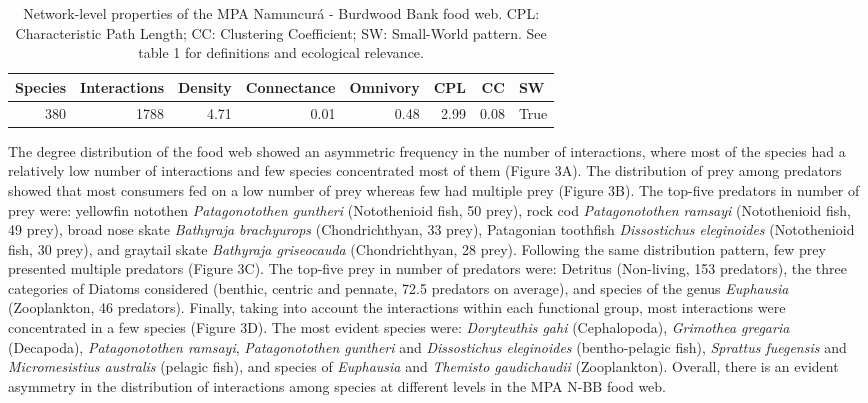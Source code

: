 \documentclass[preprint, 3p,
authoryear]{elsarticle} %
\begin{document}
\begin{table}

\caption{\label{tab:table2}Network-level properties of the MPA Namuncurá - Burdwood Bank food web. CPL: Characteristic Path Length; CC: Clustering Coefficient; SW: Small-World pattern. See table 1 for definitions and ecological relevance.}
\centering
\begin{tabular}[t]{r|r|r|r|r|r|r|l}
\hline
\textbf{Species} & \textbf{Interactions} & \textbf{Density} & \textbf{Connectance} & \textbf{Omnivory} & \textbf{CPL} & \textbf{CC} & \textbf{SW}\\
\hline
380 & 1788 & 4.71 & 0.01 & 0.48 & 2.99 & 0.08 & True\\
\hline
\end{tabular}
\end{table}

The degree distribution of the food web showed an asymmetric frequency
in the number of interactions, where most of the species had a
relatively low number of interactions and few species concentrated most
of them (Figure 3A). The distribution of prey among predators showed
that most consumers fed on a low number of prey whereas few had multiple
prey (Figure 3B). The top-five predators in number of prey were:
yellowfin notothen \emph{Patagonotothen guntheri} (Notothenioid fish, 50
prey), rock cod \emph{Patagonotothen ramsayi} (Notothenioid fish, 49
prey), broad nose skate \emph{Bathyraja brachyurops} (Chondrichthyan, 33
prey), Patagonian toothfish \emph{Dissostichus eleginoides}
(Notothenioid fish, 30 prey), and graytail skate \emph{Bathyraja
griseocauda} (Chondrichthyan, 28 prey). Following the same distribution
pattern, few prey presented multiple predators (Figure 3C). The top-five
prey in number of predators were: Detritus (Non-living, 153 predators),
the three categories of Diatoms considered (benthic, centric and
pennate, 72.5 predators on average), and species of the genus
\emph{Euphausia} (Zooplankton, 46 predators). Finally, taking into
account the interactions within each functional group, most interactions
were concentrated in a few species (Figure 3D). The most evident species
were: \emph{Doryteuthis gahi} (Cephalopoda), \emph{Grimothea gregaria}
(Decapoda), \emph{Patagonotothen ramsayi}, \emph{Patagonotothen
guntheri} and \emph{Dissostichus eleginoides} (bentho-pelagic fish),
\emph{Sprattus fuegensis} and \emph{Micromesistius australis} (pelagic
fish), and species of \emph{Euphausia} and \emph{Themisto gaudichaudii}
(Zooplankton). Overall, there is an evident asymmetry in the
distribution of interactions among species at different levels in the
MPA N-BB food web.
\end{document}
